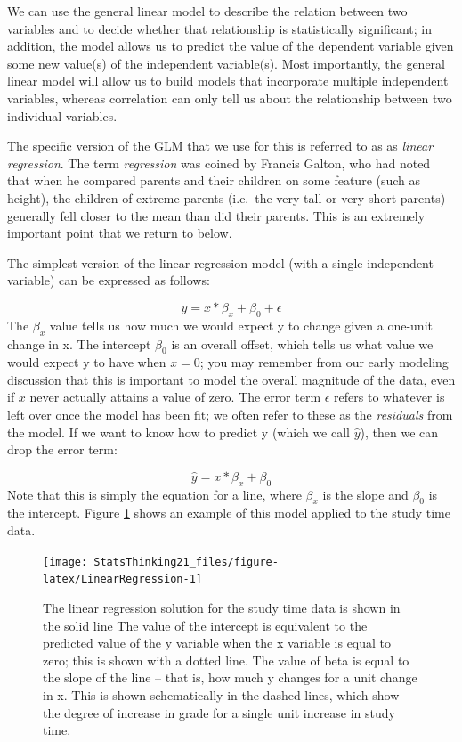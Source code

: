 \documentclass[12pt,]{book}
\theoremstyle{definition}
\theoremstyle{definition}
\theoremstyle{definition}
\theoremstyle{remark}
\begin{document}
We can use the general linear model to describe the relation between two variables and to decide whether that relationship is statistically significant; in addition, the model allows us to predict the value of the dependent variable given some new value(s) of the independent variable(s). Most importantly, the general linear model will allow us to build models that incorporate multiple independent variables, whereas correlation can only tell us about the relationship between two individual variables.

The specific version of the GLM that we use for this is referred to as as \emph{linear regression}. The term \emph{regression} was coined by Francis Galton, who had noted that when he compared parents and their children on some feature (such as height), the children of extreme parents (i.e.~the very tall or very short parents) generally fell closer to the mean than did their parents. This is an extremely important point that we return to below.

The simplest version of the linear regression model (with a single independent variable) can be expressed as follows:

\[
y = x * \beta_x + \beta_0 + \epsilon
\]
The \(\beta_x\) value tells us how much we would expect y to change given a one-unit change in x. The intercept \(\beta_0\) is an overall offset, which tells us what value we would expect y to have when \(x=0\); you may remember from our early modeling discussion that this is important to model the overall magnitude of the data, even if \(x\) never actually attains a value of zero. The error term \(\epsilon\) refers to whatever is left over once the model has been fit; we often refer to these as the \emph{residuals} from the model. If we want to know how to predict y (which we call \(\hat{y}\)), then we can drop the error term:

\[
\hat{y} = x * \beta_x + \beta_0 
\]
Note that this is simply the equation for a line, where \(\beta_x\) is the slope and \(\beta_0\) is the intercept. Figure \ref{fig:LinearRegression} shows an example of this model applied to the study time data.

\begin{figure}
\texttt{[image: StatsThinking21\_files/figure-latex/LinearRegression-1]} \caption{The linear regression solution for the study time data is shown in the solid line The value of the intercept is equivalent to the predicted value of the y variable when the x variable is equal to zero; this is shown with a dotted line.  The value of beta is equal to the slope of the line -- that is, how much y changes for a unit change in x.  This is shown schematically in the dashed lines, which show the degree of increase in grade for a single unit increase in study time.}\label{fig:LinearRegression}
\end{figure}
\end{document}
